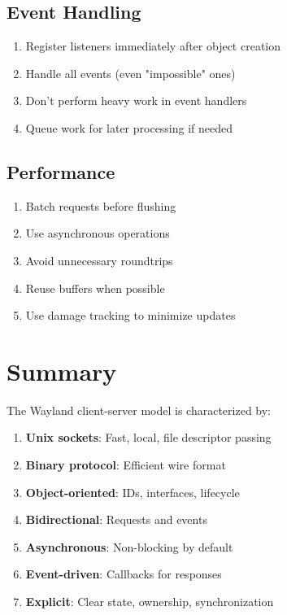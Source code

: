 \subsection{Event Handling}

\begin{enumerate}
    \item Register listeners immediately after object creation
    \item Handle all events (even "impossible" ones)
    \item Don't perform heavy work in event handlers
    \item Queue work for later processing if needed
\end{enumerate}

\subsection{Performance}

\begin{enumerate}
    \item Batch requests before flushing
    \item Use asynchronous operations
    \item Avoid unnecessary roundtrips
    \item Reuse buffers when possible
    \item Use damage tracking to minimize updates
\end{enumerate}

\section{Summary}

The Wayland client-server model is characterized by:

\begin{enumerate}
    \item \textbf{Unix sockets}: Fast, local, file descriptor passing
    \item \textbf{Binary protocol}: Efficient wire format
    \item \textbf{Object-oriented}: IDs, interfaces, lifecycle
    \item \textbf{Bidirectional}: Requests and events
    \item \textbf{Asynchronous}: Non-blocking by default
    \item \textbf{Event-driven}: Callbacks for responses
    \item \textbf{Explicit}: Clear state, ownership, synchronization
\end{enumerate}

